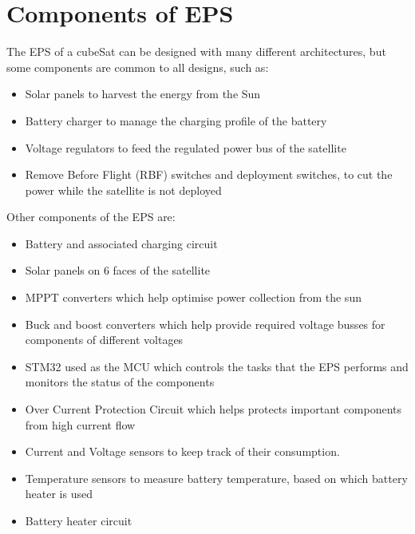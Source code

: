 \section[Components of EPS]{Components of EPS}
The EPS of a cubeSat can be designed with many different architectures, but some
components are common to all designs, such as:
\begin{itemize}
	\item Solar panels to harvest the energy from the Sun
	\item Battery charger to manage the charging profile of the battery
	\item Voltage regulators to feed the regulated power bus of the satellite
	\item Remove Before Flight (RBF) switches and deployment switches, to cut the
	power while the satellite is not deployed
\end{itemize}
Other components of the EPS are:
\begin{itemize}
	\item Battery and associated charging circuit
	\item Solar panels on 6 faces of the satellite
	\item MPPT converters which help optimise power collection from the sun
	\item Buck and boost converters which help provide required voltage busses for
	components of different voltages
	\item  STM32 used as the MCU which controls the tasks that the EPS performs and
	monitors the status of the components
	\item Over Current Protection Circuit which helps protects important components from
	high current flow
	\item  Current and Voltage sensors to keep track of their consumption.
	\item  Temperature sensors to measure battery temperature, based on which battery
	heater is used
	\item Battery heater circuit
\end{itemize}
